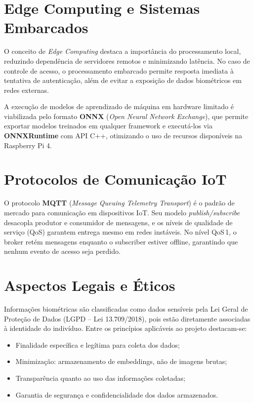 \documentclass[12pt,a4paper]{report}
\begin{document}
\section{Edge Computing e Sistemas Embarcados}

O conceito de \textit{Edge Computing} destaca a importância do processamento local, reduzindo dependência de servidores remotos e minimizando latência. No caso de controle de acesso, o processamento embarcado permite resposta imediata à tentativa de autenticação, além de evitar a exposição de dados biométricos em redes externas.

A execução de modelos de aprendizado de máquina em hardware limitado é viabilizada pelo formato \textbf{ONNX} (\textit{Open Neural Network Exchange}), que permite exportar modelos treinados em qualquer framework e executá-los via \textbf{ONNXRuntime} com API C++, otimizando o uso de recursos disponíveis na Raspberry Pi 4.

\section{Protocolos de Comunicação IoT}

O protocolo \textbf{MQTT} (\textit{Message Queuing Telemetry Transport}) é o padrão de mercado para comunicação em dispositivos IoT. Seu modelo \textit{publish/subscribe} desacopla produtor e consumidor de mensagens, e os níveis de qualidade de serviço (QoS) garantem entrega mesmo em redes instáveis. No nível QoS\,1, o broker retém mensagens enquanto o subscriber estiver offline, garantindo que nenhum evento de acesso seja perdido.

\section{Aspectos Legais e Éticos}

Informações biométricas são classificadas como dados sensíveis pela Lei Geral de Proteção de Dados (LGPD -- Lei 13.709/2018), pois estão diretamente associadas à identidade do indivíduo. Entre os princípios aplicáveis ao projeto destacam-se:

\begin{itemize}
    \item Finalidade específica e legítima para coleta dos dados;
    \item Minimização: armazenamento de embeddings, não de imagens brutas;
    \item Transparência quanto ao uso das informações coletadas;
    \item Garantia de segurança e confidencialidade dos dados armazenados.
\end{itemize}
\end{document}
